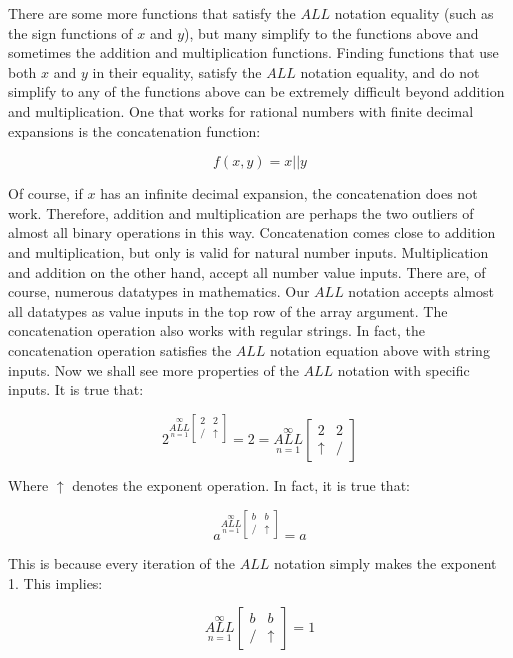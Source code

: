 \documentclass{article}
\begin{document}
There are some more functions that satisfy the $ALL$ notation equality (such as the sign functions of $x$ and $y$), but many simplify to the functions above and sometimes the addition and multiplication functions. Finding functions that use both $x$ and $y$ in their equality, satisfy the $ALL$ notation equality, and do not simplify to any of the functions above can be extremely difficult beyond addition and multiplication. One that works for rational numbers with finite decimal expansions is the concatenation function:

$$f(x,y) = x||y$$

Of course, if $x$ has an infinite decimal expansion, the concatenation does not work. Therefore, addition and multiplication are perhaps the two outliers of almost all binary operations in this way. Concatenation comes close to addition and multiplication, but only is valid for natural number inputs. Multiplication and addition on the other hand, accept all number value inputs. There are, of course, numerous datatypes in mathematics. Our $ALL$ notation accepts almost all datatypes as value inputs in the top row of the array argument. The concatenation operation also works with regular strings. In fact, the concatenation operation satisfies the $ALL$ notation equation above with string inputs. Now we shall see more properties of the $ALL$ notation with specific inputs. It is true that:

$$2^{\underset{n=1}{\overset{\infty}{ALL}} \begin{bmatrix}
2 & 2 \\
/ & \uparrow
\end{bmatrix}} = 2 = \underset{n=1}{\overset{\infty}{ALL}} \begin{bmatrix}
2 & 2 \\
\uparrow & /
\end{bmatrix}$$

Where $\uparrow$ denotes the exponent operation. In fact, it is true that:

$$a^{\underset{n=1}{\overset{\infty}{ALL}} \begin{bmatrix}
b & b \\
/ & \uparrow
\end{bmatrix}} = a$$

This is because every iteration of the $ALL$ notation simply makes the exponent 1. This implies:

$$\underset{n=1}{\overset{\infty}{ALL}} \begin{bmatrix}
b & b \\
/ & \uparrow
\end{bmatrix}=1$$
\end{document}
